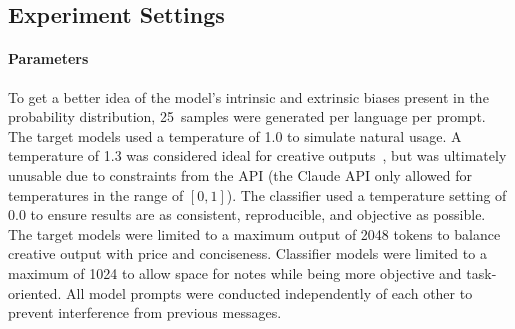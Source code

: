 \documentclass[sigconf]{acmart}
\newcommand{\samplecnt}{25}
\begin{document}
\subsection{Experiment Settings}
\label{sec:experiment_settings}
\paragraph{Parameters} To get a better idea of the model's intrinsic and extrinsic biases present in the probability distribution, \samplecnt\ samples were generated per language per prompt. The target models used a temperature of 1.0 to simulate natural usage. A temperature of 1.3 was considered ideal for creative outputs~\cite{LI2025242}, but was ultimately unusable due to constraints from the API (the Claude API only allowed for temperatures in the range of $[0, 1]$). The classifier used a temperature setting of 0.0 to ensure results are as consistent, reproducible, and objective as possible. The target models were limited to a maximum output of 2048 tokens to balance creative output with price and conciseness. Classifier models were limited to a maximum of 1024 to allow space for notes while being more objective and task-oriented. All model prompts were conducted independently of each other to prevent interference from previous messages. 
\end{document}
